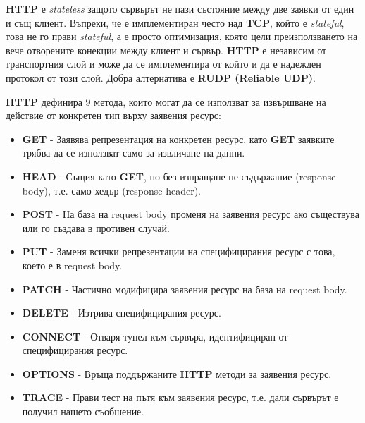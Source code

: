 \documentclass[fleqn,12pt]{article}
\begin{document}
\begin{flushleft}
\textbf{HTTP} е \textit{stateless} защото сървърът не пази състояние между две заявки от един и същ клиент.
Въпреки, че е имплементиран често над \textbf{TCP}, който е \textit{stateful}, това не го прави \textit{stateful}, а е просто оптимизация, която цели преизползването на вече отворените конекции между клиент и сървър.
\textbf{HTTP} е независим от транспортния слой и може да се имплементира от който и да е надежден протокол от този слой.
Добра алтернатива е \textbf{RUDP (Reliable UDP)}.

\textbf{HTTP} дефинира 9 метода, които могат да се използват за извършване на действие от конкретен тип върху заявения ресурс:
\begin{itemize}
    \item \textbf{GET} - Заявява репрезентация на конкретен ресурс, като \textbf{GET} заявките трябва да се използват само за извличане на данни.
    \item \textbf{HEAD} - Същия като \textbf{GET}, но без изпращане не съдържание (response body), т.е. само хедър (response header).
    \item \textbf{POST} - На база на request body променя на заявения ресурс ако съществува или го създава в противен случай.
    \item \textbf{PUT} - Заменя всички репрезентации на специфицирания ресурс с това, което е в request body.
    \item \textbf{PATCH} - Частично модифицира заявения ресурс на база на request body.
    \item \textbf{DELETE} - Изтрива специфицирания ресурс.
    \item \textbf{CONNECT} - Отваря тунел към сървъра, идентифициран от специфицирания ресурс.
    \item \textbf{OPTIONS} - Връща поддържаните \textbf{HTTP} методи за заявения ресурс.
    \item \textbf{TRACE} - Прави тест на пътя към заявения ресурс, т.е. дали сървърът е получил нашето съобшение.
\end{itemize}

\end{flushleft}
\end{document}
